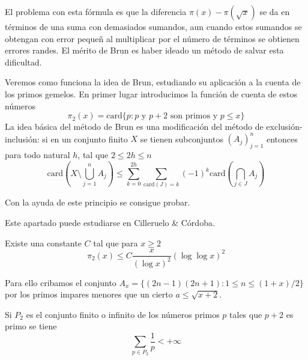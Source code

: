 \documentclass[TAN.tex]{subfiles}
\begin{document}
El problema con esta fórmula es que la diferencia $π(x)-π(\sqrt{x})$ se da en términos de una suma con demasiados sumandos, aun cuando estos sumandos se obtengan con error pequeñ al multiplicar por el número de términos se obtienen errores randes. El mérito de Brun es haber ideado un método de salvar esta dificultad.

Veremos como funciona la idea de Brun, estudiando su aplicación a la cuenta de los primos gemelos. En primer lugar introducimos la función de cuenta de estos números
\[ π_2(x) = \text{card}\{p : p \text{ y }p+2\text{ son primos y }p≤x\} \]
La idea básica del método de Brun es una modificación del método de exclusión-inclusión: si en un conjunto finito $X$ se tienen subconjuntos $(A_j)_{j=1}^n$ entonces para todo natural $h$, tal que $2≤2h≤n$
\[ \text{card}\left(X \setminus \bigcup_{j=1}^n A_j \right) ≤ \sum_{k=0}^{2h} \sum_{\text{card}(J)=k} (-1)^k \text{card}\left(\bigcap_{j\in J} A_j \right)\]

Con la ayuda de este principio se consigue probar.

Este apartado puede estudiarse en Cilleruelo \& Córdoba.

\begin{teorema}
Existe una constante $C$ tal que para $x ≥ 2$
\[ π_2(x) ≤ C \frac{x}{(\log x)^2} (\log \log x)^2 \]
\end{teorema}
Para ello cribamos el conjunto $A_x = \{(2n-1)(2n+1) : 1 ≤ n ≤ (1+x)/2\}$
por los primos impares menores que un cierto $a ≤ \sqrt{x+2}$.

\begin{coro}
Si $P_2$ es el conjunto finito o infinito de los números primos $p$ tales que $p+2$ es primo se tiene
\[ \sum_{p\in P_2} \frac{1}{p} < +∞ \]
\end{coro}
\end{document}
